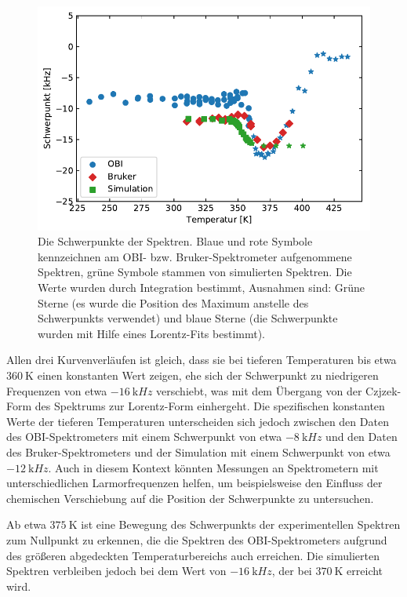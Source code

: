 \begin{figure}
	\begin{center}
		\includegraphics[width=.9\textwidth]{graphics/plot/mean4.pdf}
	\end{center}
	\caption{Die Schwerpunkte der Spektren. Blaue und rote Symbole kennzeichnen am OBI- bzw. Bruker-Spektrometer aufgenommene Spektren, grüne Symbole stammen von simulierten Spektren. Die Werte wurden durch Integration bestimmt, Ausnahmen sind: Grüne Sterne (es wurde die Position des Maximum anstelle des Schwerpunkts verwendet) und blaue Sterne (die Schwerpunkte wurden mit Hilfe eines Lorentz-Fits bestimmt).} \label{fig:res:spek_mean}
\end{figure}

Allen drei Kurvenverläufen ist gleich, dass sie bei tieferen Temperaturen bis etwa $\SI{360}{\kelvin}$ einen konstanten Wert zeigen, ehe sich der Schwerpunkt zu niedrigeren Frequenzen von etwa $\SI{-16}{\kilo Hz}$ verschiebt, was mit dem Übergang von der Czjzek-Form des Spektrums zur Lorentz-Form einhergeht. Die spezifischen konstanten Werte der tieferen Temperaturen unterscheiden sich jedoch zwischen den Daten des OBI-Spektrometers mit einem Schwerpunkt von etwa $\SI{-8}{\kilo Hz}$ und den Daten des Bruker-Spektrometers und der Simulation mit einem Schwerpunkt von etwa $\SI{-12}{\kilo Hz}$. Auch in diesem Kontext könnten Messungen an Spektrometern mit unterschiedlichen Larmorfrequenzen helfen, um beispielsweise den Einfluss der chemischen Verschiebung auf die Position der Schwerpunkte zu untersuchen.

Ab etwa $\SI{375}{\kelvin}$ ist eine Bewegung des Schwerpunkts der experimentellen Spektren zum Nullpunkt zu erkennen, die die Spektren des OBI-Spektrometers aufgrund des größeren abgedeckten Temperaturbereichs auch erreichen. Die simulierten Spektren verbleiben jedoch bei dem Wert von $\SI{-16}{\kilo Hz}$, der bei $\SI{370}{\kelvin}$ erreicht wird.

